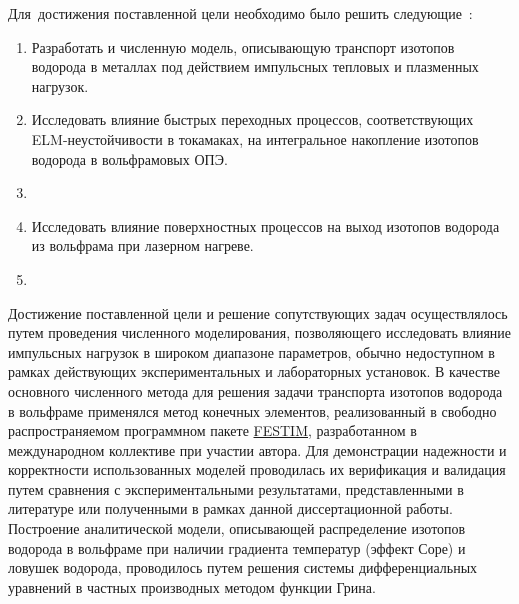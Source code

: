 Для~достижения поставленной цели необходимо было решить следующие~{\tasks}:
\begin{enumerate}[beginpenalty=10000] %
    \item Разработать и  численную модель, описывающую транспорт изотопов водорода в металлах 
    под действием импульсных тепловых и плазменных нагрузок.
    \item Исследовать влияние быстрых переходных процессов, соответствующих ELM-неустойчивости в токамаках, на интегральное накопление 
    изотопов водорода в вольфрамовых ОПЭ. 
    \item {}
    \item Исследовать влияние поверхностных процессов на выход изотопов водорода из вольфрама при лазерном нагреве. 
    \item {}
\end{enumerate}

{\methods} Достижение поставленной цели и решение сопутствующих задач осуществлялось путем проведения численного моделирования, 
позволяющего исследовать влияние импульсных нагрузок в широком диапазоне параметров, обычно недоступном в рамках действующих экспериментальных 
и лабораторных установок. В качестве основного численного метода для решения задачи транспорта изотопов водорода в вольфраме применялся 
метод конечных элементов, реализованный в свободно распространяемом программном пакете \href{https://github.com/festim-dev/FESTIM}{FESTIM}, разработанном в 
международном коллективе при участии автора. Для демонстрации надежности и корректности использованных моделей проводилась их верификация и валидация путем 
сравнения с экспериментальными результатами, представленными в литературе или полученными в рамках данной диссертационной работы. Построение аналитической модели, 
описывающей распределение изотопов водорода в вольфраме при наличии градиента температур (эффект Соре) и ловушек водорода, проводилось путем решения системы 
дифференциальных уравнений в частных производных методом функции Грина.

